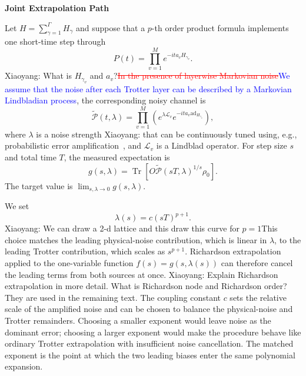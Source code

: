 \documentclass[aps,pra,reprint,superscriptaddress]{revtex4-2}
\newcommand{\Lind}{\mathcal{L}}
\newcommand{\Pcal}{\mathcal{P}}
\newcommand{\ad}{\mathrm{ad}}
\renewcommand{\tr}{\operatorname{Tr}}
\newcommand{\corr}[2]{\textcolor{red}{\sout{#1}}\textcolor{blue}{#2}}
\newcommand{\wxy}[1]{{\color{red} Xiaoyang: #1}}
\begin{document}
\noindent \textbf{Joint Extrapolation Path}

\noindent Let $H=\sum_{\gamma=1}^{\Gamma}H_\gamma$ and suppose that a $p$-th order product formula implements one short-time step through
\begin{equation}
    P(t)=\prod_{v=1}^{M} e^{-i t a_v H_{\gamma_v}} .
\end{equation}
\wxy{What is $H_{\gamma _v}$ and $a_v$?}\corr{In the presence of layerwise Markovian noise}{We assume that the noise after each Trotter layer can be described by a Markovian Lindbladian process}, the corresponding noisy channel is
\begin{equation}
    \widetilde{\Pcal}(t,\lambda)
    =
    \prod_{v=1}^{M}
    \left(e^{\lambda \Lind_v}e^{-i t a_v \ad_{H_{\gamma_v}}}\right),
\end{equation}
where $\lambda$ is a noise strength \wxy{that can be continuously tuned using, e.g., probabilistic error amplification~\cite{kim2023evidence}}, and $\Lind_v$ is a Lindblad operator.
For step size $s$ and total time $T$, the measured expectation is
\begin{equation}
    g(s,\lambda)
    =
    \tr\!\left[O\widetilde{\Pcal}(sT,\lambda)^{1/s}\rho_0\right].
\end{equation}
The target value is $\lim_{s,\lambda\to0}g(s,\lambda)$.

We set
\begin{equation}
    \lambda(s)=c(sT)^{p+1}.
    \label{eq:lambda-coupling}
\end{equation}
\wxy{We can draw a 2-d lattice and this draw this curve for $p=1$}This choice matches the leading physical-noise contribution, which is linear in $\lambda$, to the leading Trotter contribution, which scales as $s^{p+1}$.
Richardson extrapolation applied to the one-variable function $f(s)=g(s,\lambda(s))$ can therefore cancel the leading terms from both sources at once.\wxy{Explain Richardson extrapolation in more detail. What is Richardson node and Richardson order? They are used in the remaining text.}
The coupling constant $c$ sets the relative scale of the amplified noise and can be chosen to balance the physical-noise and Trotter remainders.
Choosing a smaller exponent would leave noise as the dominant error; choosing a larger exponent would make the procedure behave like ordinary Trotter extrapolation with insufficient noise cancellation.
The matched exponent is the point at which the two leading biases enter the same polynomial expansion.
\end{document}
